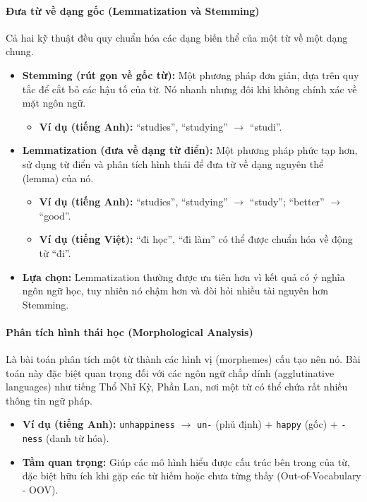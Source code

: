 \paragraph{Đưa từ về dạng gốc (Lemmatization và Stemming)}
Cả hai kỹ thuật đều quy chuẩn hóa các dạng biến thể của một từ về một dạng chung.
\begin{itemize}
    \item \textbf{Stemming (rút gọn về gốc từ):} Một phương pháp đơn giản, dựa trên quy tắc để cắt bỏ các hậu tố của từ. Nó nhanh nhưng đôi khi không chính xác về mặt ngôn ngữ.
        \begin{itemize}
            \item \textbf{Ví dụ (tiếng Anh):} “studies”, “studying” $\rightarrow$ “studi”.
        \end{itemize}
    \item \textbf{Lemmatization (đưa về dạng từ điển):} Một phương pháp phức tạp hơn, sử dụng từ điển và phân tích hình thái để đưa từ về dạng nguyên thể (lemma) của nó.
        \begin{itemize}
            \item \textbf{Ví dụ (tiếng Anh):} “studies”, “studying” $\rightarrow$ “study”; “better” $\rightarrow$ “good”.
            \item \textbf{Ví dụ (tiếng Việt):} “đi học”, “đi làm” có thể được chuẩn hóa về động từ “đi”.
        \end{itemize}
    \item \textbf{Lựa chọn:} Lemmatization thường được ưu tiên hơn vì kết quả có ý nghĩa ngôn ngữ học, tuy nhiên nó chậm hơn và đòi hỏi nhiều tài nguyên hơn Stemming.
\end{itemize}

\paragraph{Phân tích hình thái học (Morphological Analysis)}
Là bài toán phân tích một từ thành các hình vị (morphemes) cấu tạo nên nó. Bài toán này đặc biệt quan trọng đối với các ngôn ngữ chắp dính (agglutinative languages) như tiếng Thổ Nhĩ Kỳ, Phần Lan, nơi một từ có thể chứa rất nhiều thông tin ngữ pháp.
\begin{itemize}
    \item \textbf{Ví dụ (tiếng Anh):} \texttt{unhappiness} $\rightarrow$ \texttt{un-} (phủ định) + \texttt{happy} (gốc) + \texttt{-ness} (danh từ hóa).
    \item \textbf{Tầm quan trọng:} Giúp các mô hình hiểu được cấu trúc bên trong của từ, đặc biệt hữu ích khi gặp các từ hiếm hoặc chưa từng thấy (Out-of-Vocabulary - OOV).
\end{itemize}

